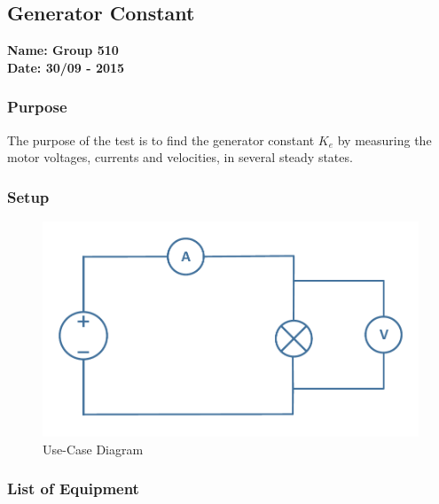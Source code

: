 \subsection{Generator Constant} %
\textbf{Name: Group 510}\\
\textbf{Date: 30/09 - 2015}

\subsubsection{Purpose}
The purpose of the test is to find the generator constant $K_e$ by measuring the motor voltages, currents and velocities, in several steady states.

\subsubsection{Setup}
\begin{figure}[H]
  \centering
	\includegraphics[scale=0.5]{figures/MotorTest4.pdf}
	\caption{Use-Case Diagram}
\end{figure}

\subsubsection{List of Equipment}


